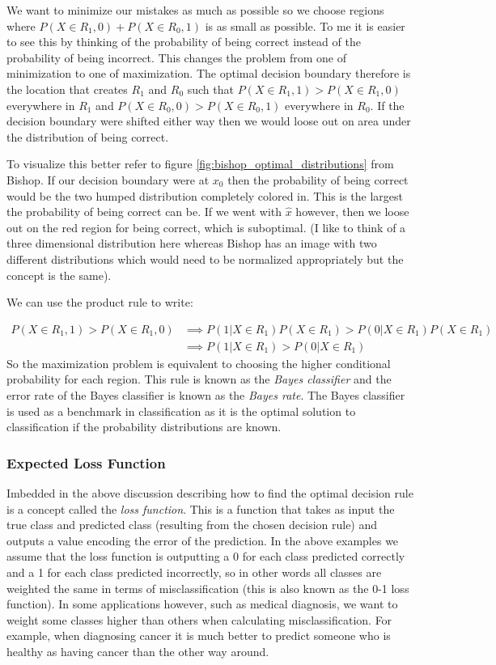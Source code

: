 \documentclass[paper=a4, fontsize=11pt]{scrartcl} %
\numberwithin{equation}{section} %
\numberwithin{figure}{section} %
\numberwithin{table}{section} %
\begin{document}
We want to minimize our mistakes as much as possible so we choose regions where $P(X\in R_1, 0) + P(X\in R_0, 1)$ is as small as possible. To me it is easier to see this by thinking of the probability of being correct instead of the probability of being incorrect. This changes the problem from one of minimization to one of maximization. The optimal decision boundary therefore is the location that creates $R_1$ and $R_0$ such that $P(X\in R_1, 1) >  P(X\in R_1, 0)$ everywhere in $R_1$ and $P(X\in R_0, 0) >  P(X\in R_0, 1)$ everywhere in $R_0$. If the decision boundary were shifted either way then we would loose out on area under the distribution of being correct. 

To visualize this better refer to figure \ref{fig:bishop_optimal_distributions} from Bishop. If our decision boundary were at $x_0$ then the probability of being correct would be the two humped distribution completely colored in. This is the largest the probability of being correct can be. If we went with $\hat{x}$ however, then we loose out on the red region for being correct, which is suboptimal. (I like to think of a three dimensional distribution here whereas Bishop has an image with two different distributions which would need to be normalized appropriately but the concept is the same).

 We can use the product rule to write:
 
 \begin{equation}
 \begin{split}
 P(X\in R_1, 1) >  P(X\in R_1, 0)  & \implies  P(1|X\in R_1) P(X \in R_1) > P(0|X\in R_1) P(X \in R_1) \\
 & \implies  P(1|X\in R_1) > P(0|X\in R_1) 
 \end{split}
 \end{equation}
 So the maximization problem is equivalent to choosing the higher conditional probability for each region. This rule is known as the \emph{Bayes classifier} and the error rate of the Bayes classifier is known as the \emph{Bayes rate}. The Bayes classifier is used as a benchmark in classification as it is the optimal solution to classification if the probability distributions are known.
 
\subsubsection{Expected Loss Function}
Imbedded in the above discussion describing how to find the optimal decision rule is a concept called the \emph{loss function}. This is a function that takes as input the true class and predicted class (resulting from the chosen decision rule) and outputs a value encoding the error of the prediction. In the above examples we assume that the loss function is outputting a 0 for each class predicted correctly and a 1 for each class predicted incorrectly, so in other words all classes are weighted the same in terms of misclassification (this is also known as the 0-1 loss function). In some applications however, such as medical diagnosis, we want to weight some classes higher than others when calculating misclassification. For example, when diagnosing cancer it is much better to predict someone who is healthy as having cancer than the other way around.
\end{document}
